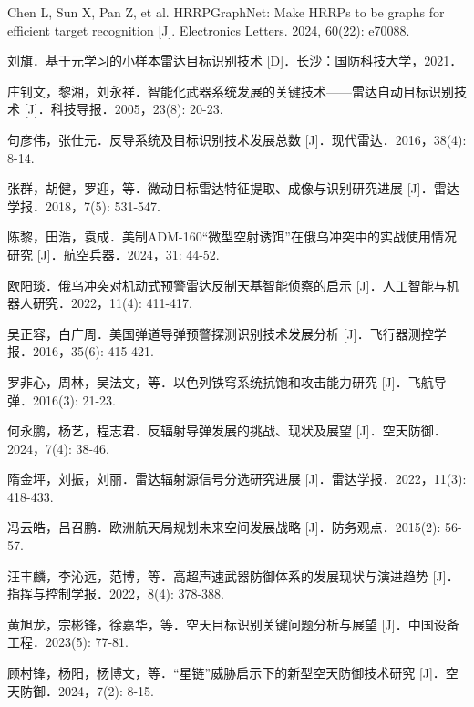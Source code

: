 \documentclass[doctor,twoside,ttf]{nudtpaper}
\begin{document}
\cleardoublepage
{}
{}

\begin{thebibliography}{99}

 Chen L, Sun X, Pan Z, et al. HRRPGraphNet: Make HRRPs to be graphs for efficient target recognition [J]. Electronics Letters. 2024, 60(22): e70088.

 刘旗．基于元学习的小样本雷达目标识别技术 [D]．长沙：国防科技大学，2021．

 庄钊文，黎湘，刘永祥．智能化武器系统发展的关键技术——雷达自动目标识别技术 [J]．科技导报．2005，23(8): 20-23.

 句彦伟，张仕元．反导系统及目标识别技术发展总数 [J]．现代雷达．2016，38(4): 8-14.

 张群，胡健，罗迎，等．微动目标雷达特征提取、成像与识别研究进展 [J]．雷达学报．2018，7(5): 531-547.

 陈黎，田浩，袁成．美制ADM-160“微型空射诱饵”在俄乌冲突中的实战使用情况研究 [J]．航空兵器．2024，31: 44-52.

 欧阳琰．俄乌冲突对机动式预警雷达反制天基智能侦察的启示 [J]．人工智能与机器人研究．2022，11(4): 411-417.

 吴正容，白广周．美国弹道导弹预警探测识别技术发展分析 [J]．飞行器测控学报．2016，35(6): 415-421.

 罗非心，周林，吴法文，等．以色列铁穹系统抗饱和攻击能力研究 [J]．飞航导弹．2016(3): 21-23.

 何永鹏，杨艺，程志君．反辐射导弹发展的挑战、现状及展望 [J]．空天防御．2024，7(4): 38-46.

 隋金坪，刘振，刘丽．雷达辐射源信号分选研究进展 [J]．雷达学报．2022，11(3): 418-433.

 冯云皓，吕召鹏．欧洲航天局规划未来空间发展战略 [J]．防务观点．2015(2): 56-57.

 汪丰麟，李沁远，范博，等．高超声速武器防御体系的发展现状与演进趋势 [J]．指挥与控制学报．2022，8(4): 378-388.

 黄旭龙，宗彬锋，徐嘉华，等．空天目标识别关键问题分析与展望 [J]．中国设备工程．2023(5): 77-81.

 顾村锋，杨阳，杨博文，等．“星链”威胁启示下的新型空天防御技术研究 [J]．空天防御．2024，7(2): 8-15.


\end{thebibliography}
\end{document}
